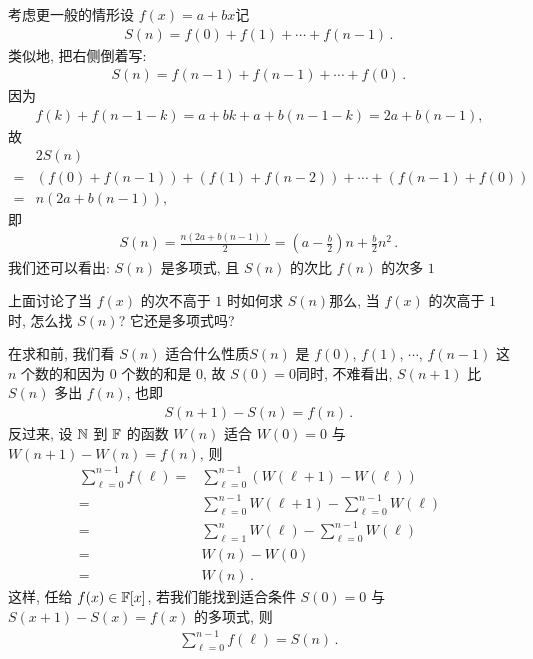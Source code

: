 \begin{example}
    考虑更一般的情形\period 设 $f(x) = a + bx$\period 记
    \begin{align*}
        S(n) = f(0) + f(1) + \cdots + f(n-1) \period
    \end{align*}
    类似地, 把右侧倒着写:
    \begin{align*}
        S(n) = f(n-1) + f(n-1) + \cdots + f(0) \period
    \end{align*}
    因为
    \begin{align*}
        f(k) + f(n-1-k) = a + bk + a + b(n-1-k) = 2a + b(n - 1),
    \end{align*}
    故
    \begin{align*}
             & 2S(n)                                                        \\
        = {} & (f(0) + f(n-1)) + (f(1) + f(n-2)) + \cdots + (f(n-1) + f(0)) \\
        = {} & n(2a + b(n - 1)),
    \end{align*}
    即
    \begin{align*}
        S(n) = \frac{n(2a + b(n - 1))}{2} = \left(a - \frac{b}{2}\right) n + \frac{b}{2} n^2 \period
    \end{align*}
    我们还可以看出: $S(n)$ 是多项式, 且 $S(n)$ 的次比 $f(n)$ 的次多 $1$\period
\end{example}

上面讨论了当 $f(x)$ 的次不高于 $1$ 时如何求 $S(n)$\period 那么, 当 $f(x)$ 的次高于 $1$ 时, 怎么找 $S(n)$? 它还是多项式吗?

在求和前, 我们看 $S(n)$ 适合什么性质\period $S(n)$ 是 $f(0)$, $f(1)$, $\cdots$, $f(n-1)$ 这 $n$ 个数的和\period 因为 $0$ 个数的和是 $0$, 故 $S(0) = 0$\period 同时, 不难看出, $S(n+1)$ 比 $S(n)$ 多出 $f(n)$, 也即
\begin{align*}
    S(n+1) - S(n) = f(n) \period
\end{align*}
反过来, 设 $\mathbb{N}$ 到 $\mathbb{F}$ 的函数 $W(n)$ 适合 $W(0) = 0$ 与 $W(n+1) - W(n) = f(n)$, 则
\begin{align*}
    \sum_{\ell = 0}^{n - 1} f(\ell)
    = {} & \sum_{\ell = 0}^{n - 1} (W(\ell+1) - W(\ell))                       \\
    = {} & \sum_{\ell = 0}^{n - 1} W(\ell+1) - \sum_{\ell = 0}^{n - 1} W(\ell) \\
    = {} & \sum_{\ell = 1}^{n} W(\ell) - \sum_{\ell = 0}^{n - 1} W(\ell)       \\
    = {} & W(n) - W(0)                                                         \\
    = {} & W(n) \period
\end{align*}
这样, 任给 $f(x) \in \mathbb{F}[x]$, 若我们能找到适合条件 $S(0) = 0$ 与 $S(x+1) - S(x) = f(x)$ 的多项式, 则
\begin{align*}
    \sum_{\ell = 0}^{n - 1} f(\ell) = S(n) \period
\end{align*}

